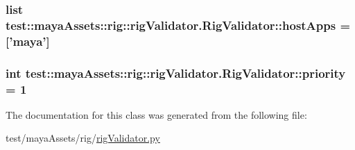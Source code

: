 \hypertarget{classtest_1_1mayaAssets_1_1rig_1_1rigValidator_1_1RigValidator_a7ddb87eb73c236c87a1d61b25b3777f6}{
\subsubsection[{host\-Apps}]{\setlength{\rightskip}{0pt plus 5cm}list {\bf test\-::maya\-Assets\-::rig\-::rig\-Validator.\-Rig\-Validator\-::host\-Apps} = \mbox{[}'maya'\mbox{]}}}\label{d7/dc1/classtest_1_1mayaAssets_1_1rig_1_1rigValidator_1_1RigValidator_a7ddb87eb73c236c87a1d61b25b3777f6}
\hypertarget{classtest_1_1mayaAssets_1_1rig_1_1rigValidator_1_1RigValidator_ae959c6221277d03d035124c2f8aebcc7}{
\subsubsection[{priority}]{\setlength{\rightskip}{0pt plus 5cm}int {\bf test\-::maya\-Assets\-::rig\-::rig\-Validator.\-Rig\-Validator\-::priority} = 1}}\label{d7/dc1/classtest_1_1mayaAssets_1_1rig_1_1rigValidator_1_1RigValidator_ae959c6221277d03d035124c2f8aebcc7}


\-The documentation for this class was generated from the following file\-:\begin{DoxyCompactItemize}
\item 
test/maya\-Assets/rig/\hyperlink{rigValidator_8py}{rig\-Validator.\-py}\end{DoxyCompactItemize}

